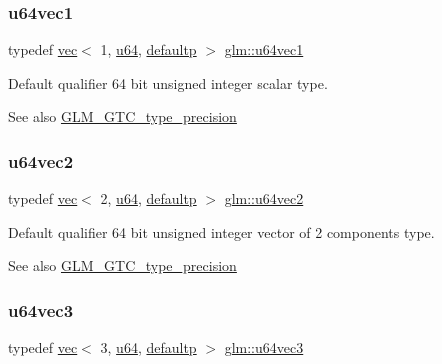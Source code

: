 \subsubsection{\texorpdfstring{u64vec1}{u64vec1}}
{\footnotesize\ttfamily typedef \hyperlink{structglm_1_1vec}{vec}$<$ 1, \hyperlink{group__gtc__type__precision_ga71cedd4972f9cb1a5e14dfe5ab83ecd7}{u64}, \hyperlink{namespaceglm_a36ed105b07c7746804d7fdc7cc90ff25a9d21ccd8b5a009ec7eb7677befc3bf51}{defaultp} $>$ \hyperlink{group__gtc__type__precision_gaf01aa7972f78cabc61558a0171d78a01}{glm\+::u64vec1}}

Default qualifier 64 bit unsigned integer scalar type. \begin{DoxySeeAlso}{See also}
\hyperlink{group__gtc__type__precision}{G\+L\+M\+\_\+\+G\+T\+C\+\_\+type\+\_\+precision} 
\end{DoxySeeAlso}
\mbox{\label{group__gtc__type__precision_ga989179a9ae798526e8bac59fb21678b7}} 
\subsubsection{\texorpdfstring{u64vec2}{u64vec2}}
{\footnotesize\ttfamily typedef \hyperlink{structglm_1_1vec}{vec}$<$ 2, \hyperlink{group__gtc__type__precision_ga71cedd4972f9cb1a5e14dfe5ab83ecd7}{u64}, \hyperlink{namespaceglm_a36ed105b07c7746804d7fdc7cc90ff25a9d21ccd8b5a009ec7eb7677befc3bf51}{defaultp} $>$ \hyperlink{group__gtc__type__precision_ga989179a9ae798526e8bac59fb21678b7}{glm\+::u64vec2}}

Default qualifier 64 bit unsigned integer vector of 2 components type. \begin{DoxySeeAlso}{See also}
\hyperlink{group__gtc__type__precision}{G\+L\+M\+\_\+\+G\+T\+C\+\_\+type\+\_\+precision} 
\end{DoxySeeAlso}
\mbox{\label{group__gtc__type__precision_ga2d3e22f2413f79536d5cf3561949cd53}} 
\subsubsection{\texorpdfstring{u64vec3}{u64vec3}}
{\footnotesize\ttfamily typedef \hyperlink{structglm_1_1vec}{vec}$<$ 3, \hyperlink{group__gtc__type__precision_ga71cedd4972f9cb1a5e14dfe5ab83ecd7}{u64}, \hyperlink{namespaceglm_a36ed105b07c7746804d7fdc7cc90ff25a9d21ccd8b5a009ec7eb7677befc3bf51}{defaultp} $>$ \hyperlink{group__gtc__type__precision_ga2d3e22f2413f79536d5cf3561949cd53}{glm\+::u64vec3}}

